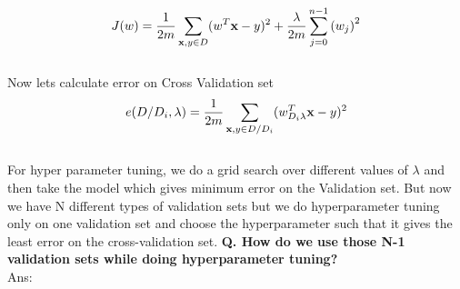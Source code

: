 \documentclass[10pt]{article}
\begin{document}
\noindent
$$J(w) = \frac{1}{2m} \sum\limits_{  \textbf{x},y \in D \notag} (w^T \textbf{x} - y)^2  + \frac{\lambda}{2m}  \sum_{j=0}^{n-1} {(w_j)}^{2}$$ \\
\noindent
Now lets calculate error on Cross Validation set \\
\noindent
$$ e(D/D_i,\lambda) = \frac{1}{2m} \sum\limits_{  \textbf{x},y \in D/D_i \notag} (w_{D_i\lambda}^T \textbf{x} - y)^2 $$ \\ 
\noindent
For hyper parameter tuning, we do a grid search over different values of $\lambda$ and then take the model which gives minimum error on the Validation set. But now we have N different types of validation sets but we do hyperparameter tuning only on one validation set and choose the hyperparameter such that it gives the least error on the cross-validation set.
\newpage
\noindent
\textbf{Q. How do we use those N-1 validation sets while doing hyperparameter tuning?}\\
\noindent
Ans: 
\end{document}
